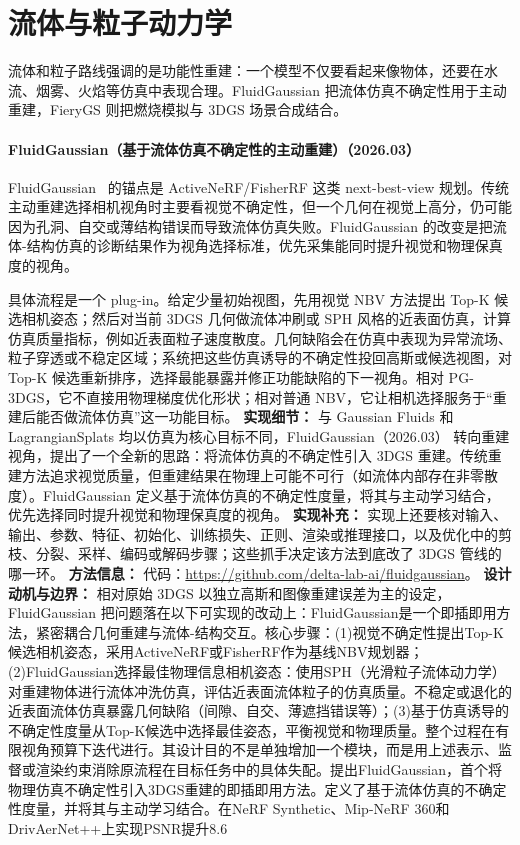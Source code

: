 \section{流体与粒子动力学}

流体和粒子路线强调的是功能性重建：一个模型不仅要看起来像物体，还要在水流、烟雾、火焰等仿真中表现合理。FluidGaussian 把流体仿真不确定性用于主动重建，FieryGS 则把燃烧模拟与 3DGS 场景合成结合。


\paragraph{FluidGaussian（基于流体仿真不确定性的主动重建）（2026.03）}
FluidGaussian~\cite{2603_21356} 的锚点是 ActiveNeRF/FisherRF 这类 next-best-view 规划。传统主动重建选择相机视角时主要看视觉不确定性，但一个几何在视觉上高分，仍可能因为孔洞、自交或薄结构错误而导致流体仿真失败。FluidGaussian 的改变是把流体-结构仿真的诊断结果作为视角选择标准，优先采集能同时提升视觉和物理保真度的视角。

具体流程是一个 plug-in。给定少量初始视图，先用视觉 NBV 方法提出 Top-K 候选相机姿态；然后对当前 3DGS 几何做流体冲刷或 SPH 风格的近表面仿真，计算仿真质量指标，例如近表面粒子速度散度。几何缺陷会在仿真中表现为异常流场、粒子穿透或不稳定区域；系统把这些仿真诱导的不确定性投回高斯或候选视图，对 Top-K 候选重新排序，选择最能暴露并修正功能缺陷的下一视角。相对 PG-3DGS，它不直接用物理梯度优化形状；相对普通 NBV，它让相机选择服务于“重建后能否做流体仿真”这一功能目标。
\textbf{实现细节：} 与 Gaussian Fluids 和 LagrangianSplats 均以仿真为核心目标不同，FluidGaussian（2026.03） 转向重建视角，提出了一个全新的思路：将流体仿真的不确定性引入 3DGS 重建。传统重建方法追求视觉质量，但重建结果在物理上可能不可行（如流体内部存在非零散度）。FluidGaussian 定义基于流体仿真的不确定性度量，将其与主动学习结合，优先选择同时提升视觉和物理保真度的视角。
\textbf{实现补充：} 实现上还要核对输入、输出、参数、特征、初始化、训练损失、正则、渲染或推理接口，以及优化中的剪枝、分裂、采样、编码或解码步骤；这些抓手决定该方法到底改了 3DGS 管线的哪一环。
\textbf{方法信息：} 代码：\url{https://github.com/delta-lab-ai/fluidgaussian}。
\textbf{设计动机与边界：} 相对原始 3DGS 以独立高斯和图像重建误差为主的设定，FluidGaussian 把问题落在以下可实现的改动上：FluidGaussian是一个即插即用方法，紧密耦合几何重建与流体-结构交互。核心步骤：(1)视觉不确定性提出Top-K候选相机姿态，采用ActiveNeRF或FisherRF作为基线NBV规划器；(2)FluidGaussian选择最佳物理信息相机姿态：使用SPH（光滑粒子流体动力学）对重建物体进行流体冲洗仿真，评估近表面流体粒子的仿真质量。不稳定或退化的近表面流体仿真暴露几何缺陷（间隙、自交、薄遮挡错误等）；(3)基于仿真诱导的不确定性度量从Top-K候选中选择最佳姿态，平衡视觉和物理质量。整个过程在有限视角预算下迭代进行。其设计目的不是单独增加一个模块，而是用上述表示、监督或渲染约束消除原流程在目标任务中的具体失配。提出FluidGaussian，首个将物理仿真不确定性引入3DGS重建的即插即用方法。定义了基于流体仿真的不确定性度量，并将其与主动学习结合。在NeRF Synthetic、Mip-NeRF 360和DrivAerNet++上实现PSNR提升8.6%
